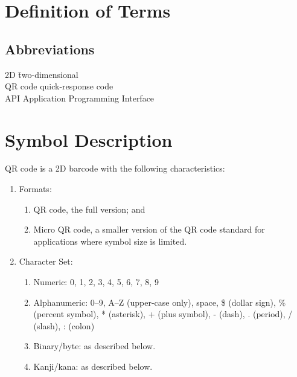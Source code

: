 \section{Definition of Terms}

\subsection{Abbreviations}

\begin{tabbing}
  2D \hspace{3em} \= two-dimensional \cite{mw-2d} \\
  QR code \> quick-response code \cite{wikipedia-qr} \\
  API \> Application Programming Interface \cite{wikipedia-api} \\
\end{tabbing}

\section{Symbol Description}

QR code is a 2D barcode with the following characteristics:

\begin{enumerate}
  \item Formats:
    \begin{enumerate}[label=\alph*.]
      \item QR code, the full version; and
      \item Micro QR code, a smaller version of the QR code standard for applications where symbol size is limited.
    \end{enumerate}
  \item Character Set\cite{wikipedia-qr}:
    \begin{enumerate}[label=\alph*.]
      \item Numeric: 0, 1, 2, 3, 4, 5, 6, 7, 8, 9
      \item Alphanumeric: 0–9, A–Z (upper-case only), space, \$ (dollar sign), \% (percent symbol), * (asterisk), + (plus symbol), - (dash), . (period), / (slash), : (colon) 
      \item Binary/byte:  as described below.
      \item Kanji/kana:  as described below.
    \end{enumerate}
\end{enumerate}

